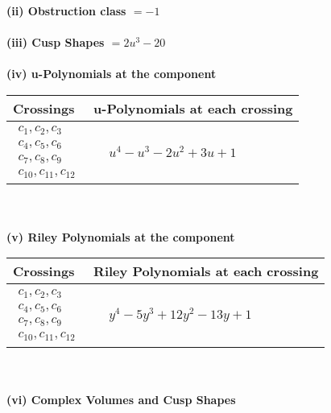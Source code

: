 \documentclass[1p]{elsarticle_modified}
\theoremstyle{definition}
\begin{document}
\flushleft \textbf{(ii) Obstruction class $= -1$}\\~\\
\flushleft \textbf{(iii) Cusp Shapes $= 2 u^3-20$}\\~\\
\newpage\renewcommand{\arraystretch}{1}
\flushleft \textbf{(iv) u-Polynomials at the component}\newline \\
\begin{tabular}{m{50pt}|m{274pt}}
Crossings & \hspace{64pt}u-Polynomials at each crossing \\
\hline $$\begin{aligned}c_{1},c_{2},c_{3}\\c_{4},c_{5},c_{6}\\c_{7},c_{8},c_{9}\\c_{10},c_{11},c_{12}\end{aligned}$$&$\begin{aligned}
&u^4- u^3-2 u^2+3 u+1
\end{aligned}$\\
\hline
\end{tabular}\\~\\
\newpage\renewcommand{\arraystretch}{1}
\flushleft \textbf{(v) Riley Polynomials at the component}\newline \\
\begin{tabular}{m{50pt}|m{274pt}}
Crossings & \hspace{64pt}Riley Polynomials at each crossing \\
\hline $$\begin{aligned}c_{1},c_{2},c_{3}\\c_{4},c_{5},c_{6}\\c_{7},c_{8},c_{9}\\c_{10},c_{11},c_{12}\end{aligned}$$&$\begin{aligned}
&y^4-5 y^3+12 y^2-13 y+1
\end{aligned}$\\
\hline
\end{tabular}\\~\\
\newpage\flushleft \textbf{(vi) Complex Volumes and Cusp Shapes}
\end{document}
